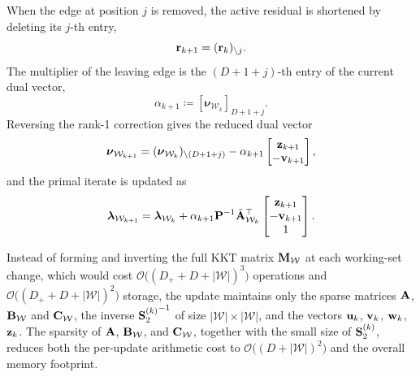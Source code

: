 When the edge at position $j$ is removed, the active residual is shortened by deleting its $j$-th entry,
\begin{equation}
	\mathbf{r}_{k+1} = (\mathbf{r}_k)_{\setminus j}.
\end{equation}
The multiplier of the leaving edge is the $(D+1+j)$-th entry of the current dual vector,
\begin{equation}
	\alpha_{k+1}\coloneqq[\boldsymbol{\nu}_{\mathcal{W}_k}]_{D+1+j}.
\end{equation}
Reversing the rank-1 correction gives the reduced dual vector
\begin{equation}\label{eq:nu_downdate_main}
	\boldsymbol{\nu}_{\mathcal{W}_{k+1}}
	=
	(\boldsymbol{\nu}_{\mathcal{W}_k})_{\setminus(D+1+j)}
	-
	\alpha_{k+1}
	\begin{bmatrix}
		\mathbf{z}_{k+1}\\-\mathbf{v}_{k+1}
	\end{bmatrix},
\end{equation}
and the primal iterate is updated as
\begin{equation}\label{eq:lambda_downdate_main}
	\boldsymbol{\lambda}_{\mathcal{W}_{k+1}}
	=
	\boldsymbol{\lambda}_{\mathcal{W}_k}
	+
	\alpha_{k+1}
	\mathbf{P}^{-1}
	\tilde{\mathbf{A}}_{\mathcal{W}_k}^\top
	\begin{bmatrix}
		\mathbf{z}_{k+1}\\-\mathbf{v}_{k+1}\\1
	\end{bmatrix}.
\end{equation}

\begin{remark}
	Instead of forming and inverting the full KKT matrix $\mathbf{M}_{\mathcal{W}}$ at each working-set change, which would cost $\mathcal{O}\big((D_+ + D + |\mathcal{W}|)^3\big)$ operations and $\mathcal{O}\big((D_+ + D + |\mathcal{W}|)^2\big)$ storage, the update maintains only the sparse matrices $\mathbf{A}$, $\mathbf{B}_\mathcal{W}$ and $\mathbf{C}_\mathcal{W}$, the inverse ${\S_2^{(k)}}^{-1}$ of size $|\mathcal{W}|\times|\mathcal{W}|$, and the vectors $\mathbf{u}_k$, $\mathbf{v}_k$, $\mathbf{w}_k$, $\mathbf{z}_k$. The sparsity of $\mathbf{A}$, $\mathbf{B}_\mathcal{W}$, and $\mathbf{C}_\mathcal{W}$, together with the small size of $\S_2^{(k)}$, reduces both the per-update arithmetic cost to $\mathcal{O}\big((D+|\mathcal{W}|)^2\big)$ and the overall memory footprint.
\end{remark}

\clearpage

